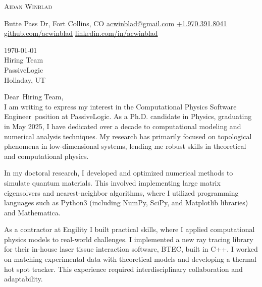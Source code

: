 \documentclass[12pt]{letter}
\makeatletter
\newcommand{\myname}{Aidan Winblad} %
\newcommand{\myemail}{acwinblad@gmail.com} %
\newcommand{\mylinkedin}{acwinblad} %
\newcommand{\mygithub}{acwinblad} %
\newcommand{\myphone}{+1.970.391.8041} %
\newcommand{\mylocation}{1007 Butte Pass Dr, Fort Collins, CO} %
\newcommand{\recipient}{Hiring Team} %
\newcommand{\greeting}{Dear} %
\newcommand{\position}{Computational Physics Software Engineer} %
\newcommand{\company}{PassiveLogic} %
\newcommand{\street}{} %
\newcommand{\city}{Holladay} %
\newcommand{\state}{UT} %
\newcommand{\zip}{} %
\makeatother
\begin{document}
\AddToShipoutPictureBG{%
\color{gr}
\AtPageUpperLeft{\rule[-1.4in]{\paperwidth}{1.3in}}
}

\begin{center}
{\fontsize{28}{0}\selectfont\scshape \myname}

\faMapMarker\enspace\mylocation\hfill
\href{mailto:\myemail}{\faEnvelope\enspace \myemail}\hfill
\href{tel:\myphone}{\faPhone\enspace \myphone}\hfill
\href{https://github.com/\mygithub}{\faGithubSquare\enspace github.com/\mygithub}\hfill
\href{https://linkedin.com/in/\mylinkedin}{\faLinkedinIn\enspace linkedin.com/in/\mylinkedin}\hfill
\end{center}

\vspace{0.2in}

\today\\

\vspace{-0.1in}\recipient\\
\company\\
\city, \state %

\vspace{-0.1in}\greeting\ \recipient,\\

\vspace{-0.1in}\setlength\parindent{24pt}
I am writing to express my interest in the \position\ position at \company.
As a Ph.D. candidate in Physics, graduating in May 2025, I have dedicated over a decade to computational modeling and numerical analysis techniques.
My research has primarily focused on topological phenomena in low-dimensional systems, lending me robust skills in theoretical and computational physics.

In my doctoral research, I developed and optimized numerical methods to simulate quantum materials.
This involved implementing large matrix eigensolvers and nearest-neighbor algorithms, where I utilized programming languages such as Python3 (including NumPy, SciPy, and Matplotlib libraries) and Mathematica.

As a contractor at Engility I built practical skills, where I applied computational physics models to real-world challenges.
I implemented a new ray tracing library for their in-house laser tissue interaction software, BTEC, built in C++.
I worked on matching experimental data with theoretical models and developing a thermal hot spot tracker.
This experience required interdisciplinary collaboration and adaptability.
\end{document}
